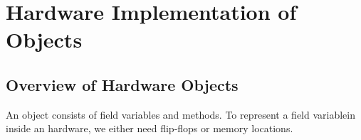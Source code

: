 \chapter{Hardware Implementation of Objects}


\section{Overview of Hardware Objects}
An object consists of field variables and methods. To represent a field
variablein inside an hardware, we either need flip-flops or memory locations. 




